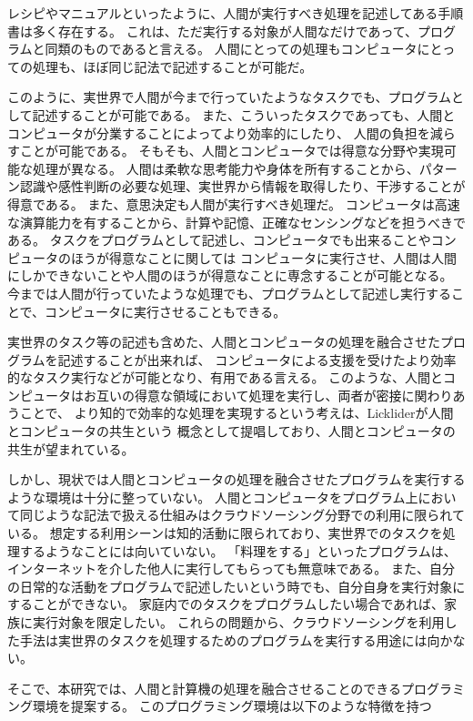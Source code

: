 レシピやマニュアルといったように、人間が実行すべき処理を記述してある手順書は多く存在する。
これは、ただ実行する対象が人間なだけであって、プログラムと同類のものであると言える。
人間にとっての処理もコンピュータにとっての処理も、ほぼ同じ記法で記述することが可能だ。

このように、実世界で人間が今まで行っていたようなタスクでも、プログラムとして記述することが可能である。
また、こういったタスクであっても、人間とコンピュータが分業することによってより効率的にしたり、
人間の負担を減らすことが可能である。
そもそも、人間とコンピュータでは得意な分野や実現可能な処理が異なる。
人間は柔軟な思考能力や身体を所有することから、パターン認識や感性判断の必要な処理、実世界から情報を取得したり、干渉することが得意である。
また、意思決定も人間が実行すべき処理だ。
コンピュータは高速な演算能力を有することから、計算や記憶、正確なセンシングなどを担うべきである。
タスクをプログラムとして記述し、コンピュータでも出来ることやコンピュータのほうが得意なことに関しては
コンピュータに実行させ、人間は人間にしかできないことや人間のほうが得意なことに専念することが可能となる。
今までは人間が行っていたような処理でも、プログラムとして記述し実行することで、コンピュータに実行させることもできる。

実世界のタスク等の記述も含めた、人間とコンピュータの処理を融合させたプログラムを記述することが出来れば、
コンピュータによる支援を受けたより効率的なタスク実行などが可能となり、有用である言える。
このような、人間とコンピュータはお互いの得意な領域において処理を実行し、両者が密接に関わりあうことで、
より知的で効率的な処理を実現するという考えは、Lickliderが人間とコンピュータの共生\cite{man-computer-symbiosis}という
概念として提唱しており、人間とコンピュータの共生が望まれている。

しかし、現状では人間とコンピュータの処理を融合させたプログラムを実行するような環境は十分に整っていない。
人間とコンピュータをプログラム上において同じような記法で扱える仕組みはクラウドソーシング分野での利用に限られている。
想定する利用シーンは知的活動に限られており、実世界でのタスクを処理するようなことには向いていない。
「料理をする」といったプログラムは、インターネットを介した他人に実行してもらっても無意味である。
また、自分の日常的な活動をプログラムで記述したいという時でも、自分自身を実行対象にすることができない。
家庭内でのタスクをプログラムしたい場合であれば、家族に実行対象を限定したい。
これらの問題から、クラウドソーシングを利用した手法は実世界のタスクを処理するためのプログラムを実行する用途には向かない。

そこで、本研究では、人間と計算機の処理を融合させることのできるプログラミング環境を提案する。
このプログラミング環境は以下のような特徴を持つ


